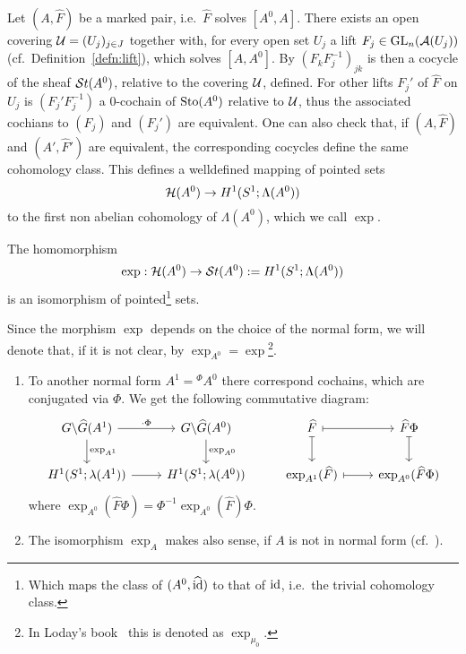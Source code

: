 Let $(A,\hat F)$ be a marked pair, i.e.\ $\hat F$ solves $[A^0,A]$.
There exists an open covering $\mathcal{U}=(U_j)_{j\in J}$ together with, for every
open set $U_j$ a lift $F_j\in\operatorname{GL}_n(\mathcal{A}(U_j))$
(cf.\ Definition~\ref{defn:lift}), which solves $[A,A^0]$.
By $(F_kF_j^{-1})_{jk}$ is then a cocycle of the sheaf $\mathcal{S}{}t(A^0)$, relative to
the covering $\mathcal{U}$, defined.
For other lifts $F_j'$ of $\hat F$ on $U_j$ is $(F_j'F_j^{-1})$ a $0$-cochain
of $\operatorname{Sto}(A^0)$ relative to $\mathcal{U}$, thus the associated cochians to $(F_j)$ and
$(F_j')$ are equivalent.
One can also check that, if $(A,\hat F)$ and $(A',\hat F')$ are equivalent, the
corresponding cocycles define the same cohomology class.
This defines a welldefined mapping of pointed sets
\[
  \mathcal{H}(A^0)\to H^1(S^1;\Lambda(A^0))
\]
to the first non abelian cohomology of $\Lambda(A^0)$, which we call $\exp$.

\begin{tthm} \label{thm:mainThm1}
  The homomorphism
  \[
    \exp:\mathcal{H}(A^0)\to\mathcal{S}{}t(A^0):=H^1(S^1;\Lambda(A^0))
  \]
  is an isomorphism of pointed\footnote{Which maps the class of
  $(A^0,\widehat{\operatorname{id}})$ to that of $\operatorname{id}$, i.e.\ the trivial cohomology class.} sets.
\end{tthm}
Since the morphism $\exp$ depends on the choice of the normal form, we will
denote that, if it is not clear, by
$\exp_{A^0}=\exp$\footnote{In Loday's book~\cite{Loday1994} this is denoted as
$\exp_{\mu_0}$.}.
\begin{rem}\label{rem:expNonNormalForm}
  \begin{enumerate}
    \item {}
      To another normal form $A^1={}^\Phi\!A^0$ there correspond cochains,
      which are conjugated via $\Phi$.
      We get the following commutative diagram:
      \[ \begin{tikzcd}
          G\backslash\hat G(A^1) \rar{\cdot\Phi}\dar{\exp_{A^1}}
          & G\backslash\hat G(A^0) \dar{\exp_{A^0}}
          & \hat F \arrow[|->]{r}\arrow[|->]{d}
          & \hat F\Phi \arrow[|->]{d}
        \\ H^1(S^1;\lambda(A^1)) \rar
          & H^1(S^1;\lambda(A^0))
          & \exp_{A^1}(\hat F) \arrow[|->]{r}
          & \exp_{A^0}(\hat F\Phi)
      \end{tikzcd} \]
      where $\exp_{A^0}(\hat F\Phi)=\Phi^{-1}\exp_{A^0}(\hat F)\Phi$.
      \TODO[$\Phi\in G(\!(t)\!)$???]
    \item The isomorphism $\exp_A$ makes also sense, if $A$ is not in normal
      form (cf.\ \cite[883]{Loday1994}).
  \end{enumerate}
\end{rem}

